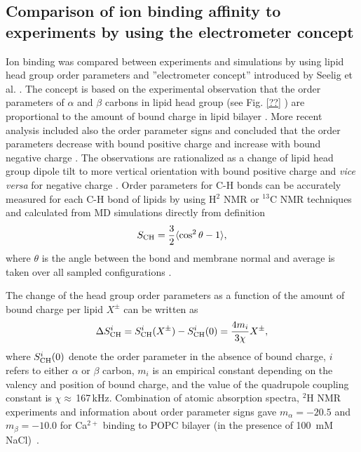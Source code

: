 \documentclass[aip,jcp,twocolumn]{revtex4}
\begin{document}
\subsection{Comparison of ion binding affinity to experiments by using the electrometer concept}
Ion binding was compared between experiments and simulations by 
using lipid head group order parameters and ''electrometer concept'' 
introduced by Seelig et al. \cite{seelig87,catte16}.
The concept is based on the experimental observation that the 
order parameters of $\alpha$ and $\beta$ carbons in lipid head group
(see Fig. \ref{??} 
) 
are proportional to the amount of bound charge
in lipid bilayer \cite{seelig87}.
More recent analysis included also
the order parameter signs and concluded that the order parameters  
decrease with bound positive charge and increase with bound negative 
charge \cite{ollila16,catte16}. The observations are rationalized 
as a change of lipid head group dipole tilt to more vertical orientation
with bound positive charge and {\it vice versa} for negative charge \cite{seelig87}. 
Order parameters for C-H bonds can be accurately measured for each
C-H bond of lipids by using H$^2$ NMR or $^{13}$C NMR techniques and
calculated from MD simulations directly from definition
\begin{equation}\label{OP}
S_{\rm CH}=\frac{3}{2}\langle \cos^2\theta -1 \rangle,
\end{equation}
where $\theta$ is the angle between the bond and membrane
normal and average is taken over all sampled configurations \cite{ollila16}.


The change of the head group order parameters as a function of
the amount of bound charge per lipid $X^\pm$ 
can be written as~\cite{ferreira16}
\begin{equation}\label{OPchangeEQ}
\Delta S_{\rm{CH}}^{i}= S_{\rm{CH}}^{i}(X^\pm)-S_{\rm{CH}}^{i}(0) =\frac{4m_i }{3\chi}X^\pm,
\end{equation}
where $S_{\rm{CH}}^{i}(0)$ denote the order parameter in the absence of bound charge,
$i$ refers to either $\alpha$ or $\beta$ carbon,
$m_i$ is an empirical constant depending on the valency and position of bound charge,
and the value of the quadrupole coupling constant is $\chi \approx$\,167\,kHz.
Combination of atomic absorption spectra, $^2$H NMR experiments
and information about order parameter signs gave
$m_\alpha=-20.5$  and $m_\beta=-10.0$ for Ca$^{2+}$ binding to POPC
bilayer (in the presence of 100~mM NaCl)~\cite{altenbach84,ollila16,catte16}.
\end{document}
